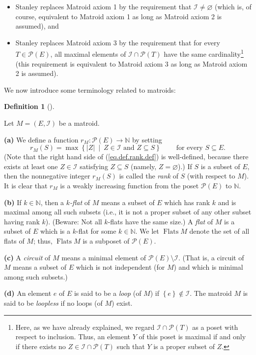 \documentclass[numbers=enddot,12pt,final,onecolumn,notitlepage]{scrartcl}%
\theoremstyle{definition}
\newtheorem{defi}[theo]{Definition}
\newenvironment{definition}[1][]
{\begin{defi}[#1]\begin{leftbar}}
{\end{leftbar}\end{defi}}
\begin{document}
\begin{itemize}
\item Stanley replaces Matroid axiom 1 by the requirement that $\mathcal{I}%
\neq\varnothing$ (which is, of course, equivalent to Matroid axiom 1 as long
as Matroid axiom 2 is assumed), and

\item Stanley replaces Matroid axiom 3 by the requirement that for every
$T\in\mathcal{P}\left(  E\right)  $, all maximal elements of $\mathcal{I}%
\cap\mathcal{P}\left(  T\right)  $ have the same cardinality\footnote{Here, as
we have already explained, we regard $\mathcal{I}\cap\mathcal{P}\left(
T\right)  $ as a poset with respect to inclusion. Thus, an element $Y$ of this
poset is maximal if and only if there exists no $Z\in\mathcal{I}%
\cap\mathcal{P}\left(  T\right)  $ such that $Y$ is a proper subset of $Z$.}
(this requirement is equivalent to Matroid axiom 3 as long as Matroid axiom 2
is assumed).
\end{itemize}

We now introduce some terminology related to matroids:

\begin{definition}
\label{def.matroid.notions}Let $M=\left(  E,\mathcal{I}\right)  $ be a matroid.

\textbf{(a)} We define a function $r_{M}:\mathcal{P}\left(  E\right)
\rightarrow\mathbb{N}$ by setting%
\begin{equation}
r_{M}\left(  S\right)  =\max\left\{  \left\vert Z\right\vert \ \mid
\ Z\in\mathcal{I}\text{ and }Z\subseteq S\right\}
\ \ \ \ \ \ \ \ \ \ \text{for every }S\subseteq E. \label{eq.def.rank.def}%
\end{equation}
(Note that the right hand side of (\ref{eq.def.rank.def}) is well-defined,
because there exists at least one $Z\in\mathcal{I}$ satisfying $Z\subseteq S$
(namely, $Z=\varnothing$).) If $S$ is a subset of $E$, then the nonnegative
integer $r_{M}\left(  S\right)  $ is called the \textit{rank} of $S$ (with
respect to $M$). It is clear that $r_{M}$ is a weakly increasing function from
the poset $\mathcal{P}\left(  E\right)  $ to $\mathbb{N}$.

\textbf{(b)} If $k\in\mathbb{N}$, then a $k$\textit{-flat} of $M$ means a
subset of $E$ which has rank $k$ and is maximal among all such subsets (i.e.,
it is not a proper subset of any other subset having rank $k$). (Beware: Not
all $k$-flats have the same size.) A \textit{flat} of $M$ is a subset of $E$
which is a $k$-flat for some $k\in\mathbb{N}$. We let $\operatorname*{Flats}M$
denote the set of all flats of $M$; thus, $\operatorname*{Flats}M$ is a
subposet of $\mathcal{P}\left(  E\right)  $.

\textbf{(c)} A \textit{circuit} of $M$ means a minimal element of
$\mathcal{P}\left(  E\right)  \setminus\mathcal{I}$. (That is, a circuit of
$M$ means a subset of $E$ which is not independent (for $M$) and which is
minimal among such subsets.)

\textbf{(d)} An element $e$ of $E$ is said to be a \textit{loop} (of $M$) if
$\left\{  e\right\}  \notin\mathcal{I}$. The matroid $M$ is said to be
\textit{loopless} if no loops (of $M$) exist.
\end{definition}
\end{document}

